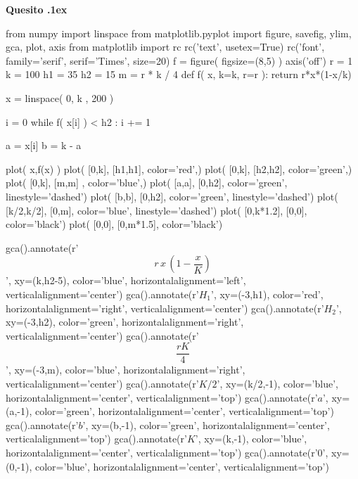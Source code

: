 \documentclass[11pt,twoside,a4paper]{article}
\newcounter{quesito}
\newenvironment{question}{\bigskip\addtocounter{quesito}{1}\bigskip\bigskip\par\textbf{Quesito \thequesito.\kern1ex}}{\vspace{\parskip}}
\begin{document}
\clearpage
\begin{question}
\begin{pycode}
from numpy import linspace
from matplotlib.pyplot import figure, savefig, ylim, gca, plot, axis
from matplotlib import rc
rc('text', usetex=True)
rc('font', family='serif', serif='Times', size=20)
f = figure( figsize=(8,5) )
axis('off')
r = 1
k = 100
h1 = 35
h2 = 15
m = r * k / 4
def f( x, k=k, r=r ):
    return r*x*(1-x/k)

x   = linspace( 0, k , 200 )

i = 0
while f( x[i] ) < h2  : 
    i += 1
    
a = x[i]
b = k - a

plot( x,f(x) )
plot( [0,k], [h1,h1], color='red',)
plot( [0,k], [h2,h2], color='green',)
plot( [0,k], [m,m] ,  color='blue',)
plot( [a,a], [0,h2], color='green', linestyle='dashed')
plot( [b,b], [0,h2], color='green', linestyle='dashed')
plot( [k/2,k/2], [0,m], color='blue', linestyle='dashed')
plot(  [0,k*1.2], [0,0], color='black')
plot(  [0,0], [0,m*1.5], color='black')

gca().annotate(r'$$r\,x\,\left(1-\frac{x}{K}\right)$$', 
                    xy=(k,h2-5), 
                    color='blue', 
                    horizontalalignment='left',  
                    verticalalignment='center')
gca().annotate(r'$H_1$', 
                    xy=(-3,h1), 
                    color='red', 
                    horizontalalignment='right',  
                    verticalalignment='center')
gca().annotate(r'$H_2$', 
                    xy=(-3,h2), 
                    color='green', 
                    horizontalalignment='right',  
                    verticalalignment='center')
gca().annotate(r'$$\frac{rK}{4}$$', 
                    xy=(-3,m), 
                    color='blue', 
                    horizontalalignment='right',  
                    verticalalignment='center')
gca().annotate(r'$K/2$', 
                    xy=(k/2,-1), 
                    color='blue', 
                    horizontalalignment='center',  
                    verticalalignment='top')
gca().annotate(r'$a$', 
                    xy=(a,-1), 
                    color='green', 
                    horizontalalignment='center',  
                    verticalalignment='top')
gca().annotate(r'$b$', 
                    xy=(b,-1), 
                    color='green', 
                    horizontalalignment='center',  
                    verticalalignment='top')
gca().annotate(r'$K$', 
                    xy=(k,-1), 
                    color='blue', 
                    horizontalalignment='center',  
                    verticalalignment='top')
gca().annotate(r'$0$', 
                    xy=(0,-1), 
                    color='blue', 
                    horizontalalignment='center',  
                    verticalalignment='top')


\end{pycode}
\end{question}
\end{document}
